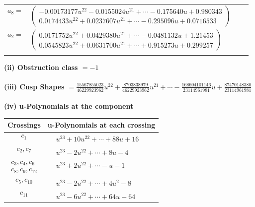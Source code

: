 \documentclass[1p]{elsarticle_modified}
\theoremstyle{definition}
\begin{document}
\begin{tabular}{m{7pt} m{180pt} m{7pt} m{180pt} }
\flushright $a_{8}=$&$\begin{pmatrix}-0.00173177 u^{22}-0.0155024 u^{21}+\cdots-0.175640 u+0.980343\\0.0174433 u^{22}+0.0237607 u^{21}+\cdots-0.295096 u+0.0716533\end{pmatrix}$ \\
\flushright $a_{2}=$&$\begin{pmatrix}0.0171752 u^{22}+0.0429380 u^{21}+\cdots-0.0481132 u+1.21453\\0.0545823 u^{22}+0.0631700 u^{21}+\cdots+0.915273 u+0.299257\end{pmatrix}$\\&\end{tabular}
\flushleft \textbf{(ii) Obstruction class $= -1$}\\~\\
\flushleft \textbf{(iii) Cusp Shapes $= \frac{15567855023}{46229923962} u^{22}+\frac{8703838979}{46229923962} u^{21}+\cdots-\frac{168604101146}{23114961981} u+\frac{87470148380}{23114961981}$}\\~\\
\newpage\renewcommand{\arraystretch}{1}
\flushleft \textbf{(iv) u-Polynomials at the component}\newline \\
\begin{tabular}{m{50pt}|m{274pt}}
Crossings & \hspace{64pt}u-Polynomials at each crossing \\
\hline $$\begin{aligned}c_{1}\end{aligned}$$&$\begin{aligned}
&u^{23}+10 u^{22}+\cdots+88 u+16
\end{aligned}$\\
\hline $$\begin{aligned}c_{2},c_{7}\end{aligned}$$&$\begin{aligned}
&u^{23}-2 u^{22}+\cdots+8 u-4
\end{aligned}$\\
\hline $$\begin{aligned}c_{3},c_{4},c_{6}\\c_{8},c_{9},c_{12}\end{aligned}$$&$\begin{aligned}
&u^{23}+2 u^{22}+\cdots- u-1
\end{aligned}$\\
\hline $$\begin{aligned}c_{5},c_{10}\end{aligned}$$&$\begin{aligned}
&u^{23}-2 u^{22}+\cdots+4 u^2-8
\end{aligned}$\\
\hline $$\begin{aligned}c_{11}\end{aligned}$$&$\begin{aligned}
&u^{23}-6 u^{22}+\cdots+64 u-64
\end{aligned}$\\
\hline
\end{tabular}\\~\\
\end{document}
